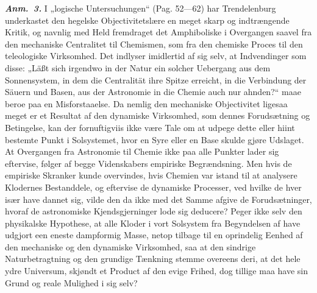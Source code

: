 \documentclass[12pt]{book}
\newcommand{\anm}[1]{\emph{\textbf{Anm.~#1.}}}
\newcommand{\opage}[1]{\marginnote{\footnotesize\textit{[#1]}}}
\begin{document}
\anm{3} I „logische Untersuchungen“ (Pag. 52---62) har Trendelenburg underkastet den
hegelske Objectivitetslære en meget skarp og indtrængende Kritik, og navnlig med Held
fremdraget det Amphiboliske i Overgangen saavel fra den mechaniske Centralitet til
Chemismen, som fra den chemiske Proces til den teleologiske Virksomhed. Det indlyser
imidlertid af sig selv, at Indvendinger som disse: „Läßt sich irgendwo in der Natur ein
solcher Uebergang aus dem Sonnensystem, in dem die Centralität ihre Spitze erreicht, in
die Verbindung der Säuern und Basen, aus der Astronomie in die Chemie auch nur ahnden?“
maae beroe paa en Misforstaaelse. Da nemlig den mechaniske Objectivitet ligesaa meget er
et Resultat af den dynamiske Virksomhed, som dennes Forudsætning og Betingelse, kan der
fornuftigviis ikke være Tale om at udpege dette eller hiint bestemte Punkt i
Solsystemet, hvor en Syre eller en Base skulde gjøre Udslaget. At Overgangen fra
Astronomie til Chemie ikke paa alle Punkter lader sig eftervise, følger af begge
Videnskabers empiriske Begrændsning. Men hvis de empiriske Skranker kunde overvindes,
hvis Chemien var istand til at analysere Klodernes
\opage{213} %
%
%
%
Bestanddele, og eftervise de dynamiske Processer, ved hvilke de hver især have dannet
sig, vilde den da ikke med det Samme afgive de Forudsætninger, hvoraf de astronomiske
Kjendsgjerninger lode sig deducere? Peger ikke selv den physikalske Hypothese, at alle
Kloder i vort Solsystem fra Begyndelsen af have udgjort een eneste dampformig Masse,
netop tilbage til en oprindelig Eenhed af den mechaniske og den dynamiske Virksomhed,
saa at den sindrige Naturbetragtning og den grundige Tænkning stemme overeens deri, at
det hele ydre Universum, skjøndt et Product af den evige Frihed, dog tillige maa have
sin Grund og reale Mulighed i sig selv?
\end{document}
